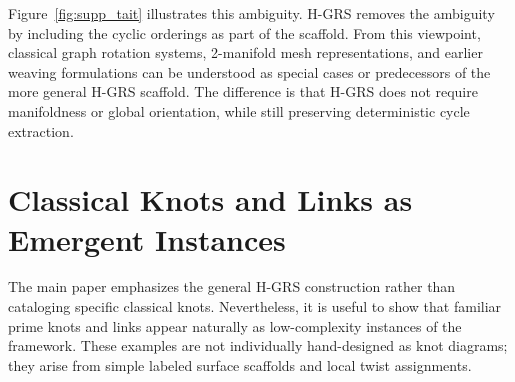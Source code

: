 \documentclass[acmtog,nonacm]{acmart}
\begin{document}
Figure~\ref{fig:supp_tait} illustrates this ambiguity. H-GRS removes the ambiguity by including the cyclic orderings as part of the scaffold. From this viewpoint, classical graph rotation systems, 2-manifold mesh representations, and earlier weaving formulations can be understood as special cases or predecessors of the more general H-GRS scaffold. The difference is that H-GRS does not require manifoldness or global orientation, while still preserving deterministic cycle extraction.

\section{Classical Knots and Links as Emergent Instances}
\label{sec:supp_classical}

The main paper emphasizes the general H-GRS construction rather than cataloging specific classical knots. Nevertheless, it is useful to show that familiar prime knots and links appear naturally as low-complexity instances of the framework. These examples are not individually hand-designed as knot diagrams; they arise from simple labeled surface scaffolds and local twist assignments.
\end{document}
